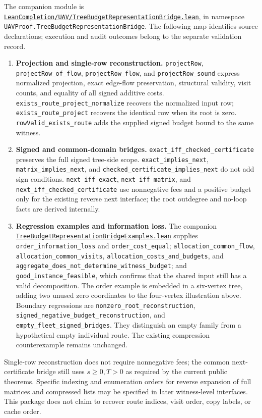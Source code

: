 \documentclass[11pt]{article}
\theoremstyle{remark}
\newcommand{\code}[1]{\nolinkurl{#1}}
\begin{document}
The companion module is
\href{https://github.com/huam54925-cpu/uav-routing-certification/blob/e5769113868b75a38016a30c2f6a8a016a14060e/LeanCompletion/UAV/TreeBudgetRepresentationBridge.lean}{\code{LeanCompletion/UAV/TreeBudgetRepresentationBridge.lean}},
in namespace \code{UAVProof.TreeBudgetRepresentationBridge}.
The following map identifies source declarations; execution and audit outcomes belong to the separate validation record.
\begin{enumerate}
 \item \textbf{Projection and single-row reconstruction.}
 \code{projectRow}, \code{projectRow_of_flow}, \code{projectRow_flow}, and
 \code{projectRow_sound} express normalized projection, exact edge-flow preservation,
 structural validity, visit counts, and equality of all signed additive costs.
 \code{exists_route_project_normalize} recovers the normalized input row;
 \code{exists_route_project} recovers the identical row when its root is zero.
 \code{rowValid_exists_route} adds the supplied signed budget bound to the same witness.
 \item \textbf{Signed and common-domain bridges.}
 \code{exact_iff_checked_certificate} preserves the full signed tree-side scope.
 \code{exact_implies_next}, \code{matrix_implies_next}, and
 \code{checked_certificate_implies_next} do not add sign conditions.
 \code{next_iff_exact}, \code{next_iff_matrix}, and \code{next_iff_checked_certificate}
 use nonnegative fees and a positive budget only for the existing reverse next interface;
 the root outdegree and no-loop facts are derived internally.
 \item \textbf{Regression examples and information loss.}
 The companion
 \href{https://github.com/huam54925-cpu/uav-routing-certification/blob/e5769113868b75a38016a30c2f6a8a016a14060e/LeanCompletion/UAV/TreeBudgetRepresentationBridgeExamples.lean}{\code{TreeBudgetRepresentationBridgeExamples.lean}}
 supplies \code{order_information_loss} and \code{order_cost_equal};
 \code{allocation_common_flow}, \code{allocation_common_visits},
 \code{allocation_costs_and_budgets}, and \code{aggregate_does_not_determine_witness_budget};
 and \code{good_instance_feasible}, which confirms that the shared input still has a valid decomposition.
 The order example is embedded in a six-vertex tree, adding two unused zero coordinates to the four-vertex illustration above.
 Boundary regressions are \code{nonzero_root_reconstruction},
 \code{signed_negative_budget_reconstruction}, and \code{empty_fleet_signed_bridges}.
 They distinguish an empty family from a hypothetical empty individual route.
 The existing compression counterexample remains unchanged.
\end{enumerate}
Single-row reconstruction does not require nonnegative fees; the common next-certificate bridge still uses $s\geq0,T>0$ as required by the current public theorems.
Specific indexing and enumeration orders for reverse expansion of full matrices and compressed lists may be specified in later witness-level interfaces.
This package does not claim to recover route indices, visit order, copy labels, or cache order.
\end{document}
